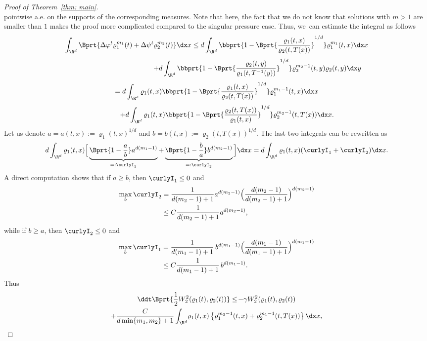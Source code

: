 \begin{proof}[Proof of Theorem~\ref{thm: main}]
\[\]
pointwise a.e. on the supports of the corresponding measures. Note that here, the fact that we do not know that solutions with $m>1$ are smaller than $1$ makes the proof more complicated compared to the singular pressure case.
Thus, we~can estimate the integral as follows
\begin{multline*}
\int_{\R^d} \Bprt{\Delta \varphi^t \varrho_1^{m_1}(t) +\Delta \psi^t \varrho_2^{m_2}(t) }\dx x
\leq d \int_{\R^d} \bbprt{1-\Bprt{\frac{\varrho_1(t,x)}{\varrho_2(t,T(x))}}^{1/d}} \varrho_1^{m_1}(t,x)\dx x \\[3pt]
\shoveright{+ d \int_{\R^d} \bbprt{1-\Bprt{\frac{\varrho_2(t,y)}{\varrho_1(t,T^{-1}(y))}}^{1/d}} \varrho_2^{m_2-1}(t,y) \varrho_2(t,y)\dx y}\\[3pt]
= d \int_{\R^d} \varrho_1(t,x) \bbprt{1-\Bprt{\frac{\varrho_1(t,x)}{\varrho_2(t,T(x))}}^{1/d}} \varrho_1^{m_1-1}(t,x) \dx x \\[3pt]
\qquad\quad + d\int_{\R^d}\varrho_1(t,x)\bbprt{1-\Bprt{\frac{\varrho_2(t,T(x))}{\varrho_1(t,x)}}^{1/d}} \varrho_2^{m_2-1}(t,T(x))\dx x.
\end{multline*}
Let us denote $a=a(t,x):= \varrho_1(t,x)^{1/d}$ and $b=b(t,x):=\varrho_2(t,T(x))^{1/d}$. The last two integrals can be rewritten as
\[
d \int_{\R^d} \varrho_1(t,x) \Big[\underbrace{\Bprt{1-\frac ab } a^{d(m_1-1)}}_{=:\curlyI_1} + \underbrace{\Bprt{1-\frac ba} b^{d(m_2-1)}}_{=:\curlyI_2}\Big]\dx x
= d \int_{\R^d} \varrho_1(t,x) (\curlyI_1 + \curlyI_2) \dx x.
\]
A direct computation shows that if $a\ge b$, then $\curlyI_1\le 0$ and
\begin{align*}
\max_b \curlyI_2 &= \frac{1}{d(m_2-1)+1} a^{d(m_2-1)} \Bigl(\frac{d(m_2-1)}{d(m_2-1)+1}\Bigr)^{d(m_2-1)} \\
&\leq C \frac{1}{d(m_2-1)+1}a^{d(m_2-1)},
\end{align*}
while if $b\ge a$, then $\curlyI_2\le 0$ and
\begin{align*}
\max_b \curlyI_1 &= \frac{1}{d(m_1-1)+1}\, b^{d(m_1-1)} \Bigl(\frac{d(m_1-1)}{d(m_1-1)+1}\Bigr)^{d(m_1-1)} \\
&\leq C \frac{1}{d(m_1-1)+1}\,b^{d(m_1-1)}.
\end{align*}
Thus
\begin{multline*}\label{intermediate}
\ddt\Bprt{\frac 12 W_2^2(\varrho_1(t), \varrho_2(t))}\leq \!- \gamma W_2^2(\varrho_1(t), \varrho_2(t))\\
+ \frac{C}{d\min\{m_1,m_2\}+1} \int_{\R^d}\! \varrho_1(t,x)\left\{\varrho_1^{m_2-1}(t,x)+\varrho_2^{m_1-1}(t,T(x))\right\}\dx x,
\end{multline*}

\end{proof}
